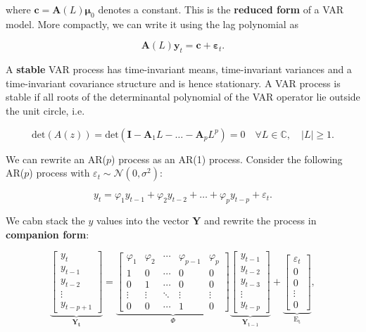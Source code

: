 where $\bm{c} = \bm{A}(L)\bm{\mu}_0$ denotes a constant. This is the \textbf{reduced form} of a VAR model. More compactly, we can write it using the lag polynomial as 

\[
	\bm{A}(L)\bm{y}_t = \bm{c} + \bm{\varepsilon}_t.
\]

A \textbf{stable} VAR process has time-invariant means, time-invariant variances and a time-invariant covariance structure and is hence stationary. A VAR process is stable if all roots of the determinantal polynomial of the VAR operator lie outside the unit circle, i.e.

\begin{equation}
	\mathrm{det}(A(z)) = \mathrm{det}(\bm{I}-\bm{A}_1L-\ldots-\bm{A}_pL^p) = 0 \quad \forall L \in \mathbb{C}, \quad |L|\geq 1.
\end{equation}

We can rewrite an AR($p$) process as an AR(1) process. Consider the following AR($p$) process with $\varepsilon_t \sim \mathcal{N}(0,\sigma^2)$:

\[
	y_t = \varphi_1 y_{t-1} + \varphi_2 y_{t-2} + \ldots + \varphi_py_{t-p} + \varepsilon_t.
\]

We cabn stack the $y$ values into the vector $\bm{Y}$ and rewrite the process in \textbf{companion form}:

\[
	\underbrace{\left[\begin{array}{c}
y_t \\
y_{t-1} \\
y_{t-2} \\
\vdots \\
y_{t-p+1}
\end{array}\right]}_{\bm{Y}_{\bm{t}}}=\underbrace{\left[\begin{array}{ccccc}
\varphi_1 & \varphi_2 & \cdots & \varphi_{p-1} & \varphi_p \\
1 & 0 & \cdots & 0 & 0 \\
0 & 1 & \cdots & 0 & 0 \\
\vdots & \vdots & \ddots & \vdots & \vdots \\
0 & 0 & \cdots & 1 & 0
\end{array}\right]}_{\Phi} \underbrace{\left[\begin{array}{c}
y_{t-1} \\
y_{t-2} \\
y_{t-3} \\
\vdots \\
y_{t-p}
\end{array}\right]}_{\bm{Y}_{\mathrm{t}-1}}+\underbrace{\left[\begin{array}{c}
\varepsilon_t \\
0 \\
0 \\
\vdots \\
0
\end{array}\right]}_{\mathrm{E}_{\mathrm{t}}},
\]

